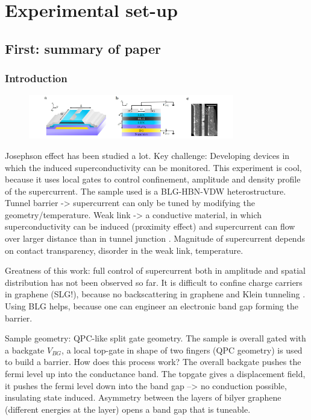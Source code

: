 \chapter{Experimental set-up}
\label{ch:experiment}

\section{First: summary of paper}
\subsection{Introduction}

\begin{figure}
\centering
\includegraphics[width=0.8\textwidth]{figure/experiment/setup}
\end{figure}

Josephson effect \cite{Josephson1962} has been studied a lot. Key challenge: Developing devices in which the induced superconductivity can be monitored. This experiment is cool, because it uses local gates to control confinement, amplitude and density profile of the supercurrent. The sample used is a BLG-HBN-VDW heterostructure.
Tunnel barrier -> supercurrent can only be tuned by modifying the geometry/temperature.
Weak link -> a conductive material, in which superconductivity can be induced (proximity effect) and supercurrent can flow over larger distance than in tunnel junction \cite{Likharev1979}.
Magnitude of supercurrent depends on contact transparency, disorder in the weak link, temperature.

Greatness of this work: full control of supercurrent both in amplitude and spatial distribution has not been observed so far. It is difficult to confine charge carriers in graphene (SLG!), because no backscattering in graphene and Klein tunneling \cite{Katsnelson2006}. Using BLG helps, because one can engineer an electronic band gap forming the barrier. 

Sample geometry: QPC-like split gate geometry. The sample is overall gated with a backgate $V_{BG}$, a local top-gate in shape of two fingers (QPC geometry) is used to build a barrier. How does this process work? The overall backgate pushes the fermi level up into the conductance band. The topgate gives a displacement field, it pushes the fermi level down into the band gap --> no conduction possible, insulating state induced.
Asymmetry between the layers of bilyer graphene (different energies at the layer) opens a band gap \cite{McCann2006} that is tuneable.

